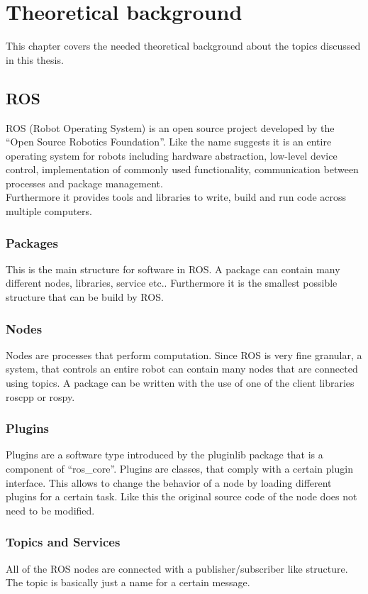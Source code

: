 \chapter{Theoretical background}
\label{theoretical_background}
This chapter covers the needed theoretical background about the topics discussed in this thesis.

\section{ROS}
ROS (Robot Operating System) is an open source project developed by the ``Open Source Robotics Foundation''. Like the name suggests it is an entire operating system for robots including hardware abstraction, low-level device control, implementation of commonly used functionality, communication between processes and package management.\\
Furthermore it provides tools and libraries to write, build and run code across multiple computers\cite{rosintro}.\\

\subsection{Packages}
This is the main structure for software in ROS. A package can contain many different nodes, libraries, service etc.. Furthermore it is the smallest possible structure that can be build by ROS\cite{rosconcepts}.
\subsection{Nodes}
Nodes are processes that perform computation. Since ROS is very fine granular, a system, that controls an entire robot can contain many nodes that are connected using topics. A package can be written with the use of one of the client libraries roscpp or rospy\cite{rosconcepts}.
\subsection{Plugins}

Plugins are a software type introduced by the pluginlib package that is a component of ``ros\_core''. Plugins are classes, that comply with a certain plugin interface. This allows to change the behavior of a node by loading different plugins for a certain task. Like this the original source code of the node does not need to be modified\cite{pluginlib}.

\subsection{Topics and Services}
All of the ROS nodes are connected with a publisher/subscriber like structure. The topic is basically just a name for a certain message.\\

